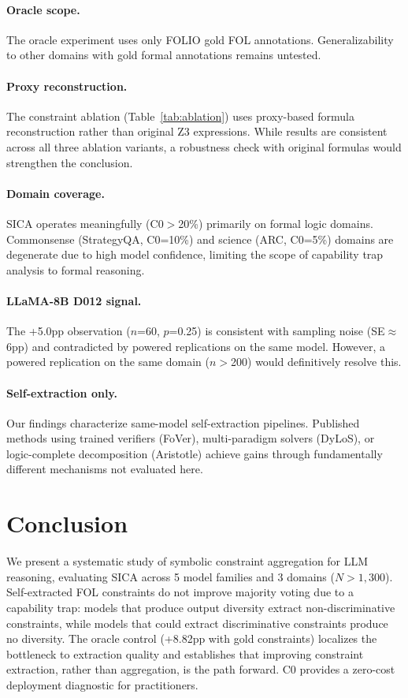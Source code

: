 \documentclass[11pt,a4paper]{article}
\begin{document}
\paragraph{Oracle scope.} The oracle experiment uses only FOLIO gold FOL annotations. Generalizability to other domains with gold formal annotations remains untested.

\paragraph{Proxy reconstruction.} The constraint ablation (Table~\ref{tab:ablation}) uses proxy-based formula reconstruction rather than original Z3 expressions. While results are consistent across all three ablation variants, a robustness check with original formulas would strengthen the conclusion.

\paragraph{Domain coverage.} SICA operates meaningfully (C0$>$20\%) primarily on formal logic domains. Commonsense (StrategyQA, C0=10\%) and science (ARC, C0=5\%) domains are degenerate due to high model confidence, limiting the scope of capability trap analysis to formal reasoning.

\paragraph{LLaMA-8B D012 signal.} The +5.0pp observation ($n$=60, $p$=0.25) is consistent with sampling noise (SE$\approx$6pp) and contradicted by powered replications on the same model. However, a powered replication on the same domain ($n$$>$200) would definitively resolve this.

\paragraph{Self-extraction only.} Our findings characterize same-model self-extraction pipelines. Published methods using trained verifiers (FoVer), multi-paradigm solvers (DyLoS), or logic-complete decomposition (Aristotle) achieve gains through fundamentally different mechanisms not evaluated here.

\section{Conclusion}

We present a systematic study of symbolic constraint aggregation for LLM reasoning, evaluating SICA across 5 model families and 3 domains ($N>1{,}300$). Self-extracted FOL constraints do not improve majority voting due to a capability trap: models that produce output diversity extract non-discriminative constraints, while models that could extract discriminative constraints produce no diversity. The oracle control (+8.82pp with gold constraints) localizes the bottleneck to extraction quality and establishes that improving constraint extraction, rather than aggregation, is the path forward. C0 provides a zero-cost deployment diagnostic for practitioners.
\end{document}

